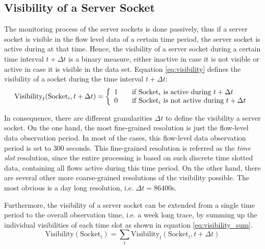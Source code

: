 \subsection{Visibility of a Server Socket}

The monitoring process of the server sockets is done passively, thus if a server socket is visible in the flow level data of a certain time period, the server socket is active during at that time. Hence, the visibility of a server socket during a certain time interval $t+\Delta{t}$ is a binary measure, either inactive in case it is not visible or active in case it is visible in the data set. Equation \ref{eq:visibility} defines the visibility of a socket during the time interval $t+\Delta{t}$: 
\begin{equation}
	\text{Visibility}_t(\text{Socket}_i,t+\Delta{t}) = \left\{ 
	\begin{array}{l l}
		1 & \quad \text{if $\text{Socket}_i$ is active during $t+\Delta{t}$}\\
		0 & \quad \text{if $\text{Socket}_i$ is not active during $t+\Delta{t}$}\\
	\end{array}
	\right. 
	\label{eq:visibility} 
\end{equation}

In consequence, there are different granularities $\Delta{t}$ to define the visibility a server socket. On the one hand, the most fine-grained resolution is just the flow-level data observation period. In most of the cases, this flow-level data observation period is set to 300 seconds. This fine-grained resolution is referred as the \emph{time slot} resolution, since the entire processing is based on such discrete time slotted data, containing all flows active during this time period. 
On the other hand, there are several other more coarse-grained resolutions of the visibility possible. The most obvious is a day long resolution, i.e. $\Delta{t} = 86400$s.

Furthermore, the visibility of a server socket can be extended from a single time period to the overall observation time, i.e. a week long trace, by summing up the individual visibilities of each time slot as shown in equation \ref{eq:visibility_sum}.
\begin{equation}
	\text{Visibility}(\text{Socket}_i) = \sum_{t} \text{Visibility}_t(\text{Socket}_i,t+\Delta{t})
	\label{eq:visibility_sum} 
\end{equation}

